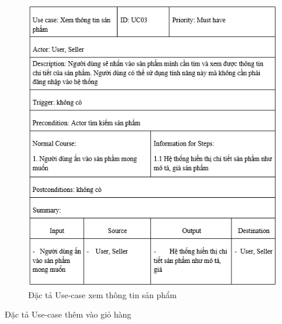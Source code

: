 \documentclass{article}
\begin{document}
{{{	\begin{center}
		\begin{figure}[htp]
			\begin{center}
				\includegraphics[scale=.950]{anh12.png}
			\end{center}
			\caption{Đặc tả Use-case xem thông tin sản phẩm}
			
		\end{figure}
	\end{center}
\newpage
{\large Đặc tả Use-case thêm vào giỏ hàng
	
}}}}
\end{document}
